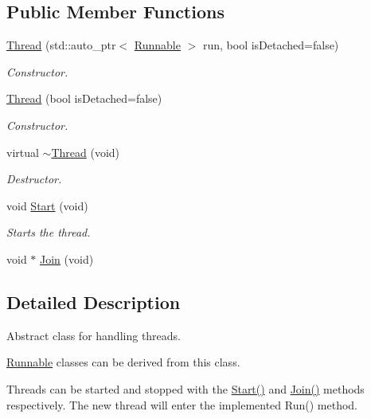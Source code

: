 \subsection*{Public Member Functions}
\begin{DoxyCompactItemize}
\item 
\hyperlink{class_thread_a027b9eb38e4d59c076501b305b42f575}{Thread} (std\-::auto\-\_\-ptr$<$ \hyperlink{class_runnable}{Runnable} $>$ run, bool is\-Detached=false)
\begin{DoxyCompactList}\small\item\em Constructor. \end{DoxyCompactList}\item 
\hyperlink{class_thread_a403714feecd93ac10c101a47b7649204}{Thread} (bool is\-Detached=false)
\begin{DoxyCompactList}\small\item\em Constructor. \end{DoxyCompactList}\item 
virtual \hyperlink{class_thread_af1e25588ebe47a2a6d79ef8c686a992b}{$\sim$\-Thread} (void)
\begin{DoxyCompactList}\small\item\em Destructor. \end{DoxyCompactList}\item 
void \hyperlink{class_thread_a2b42f82341afd2747ea093b6ac8b91cb}{Start} (void)
\begin{DoxyCompactList}\small\item\em Starts the thread. \end{DoxyCompactList}\item 
void $\ast$ \hyperlink{class_thread_a8f33f7750321d5df9188033e7e3e300d}{Join} (void)
\end{DoxyCompactItemize}


\subsection{Detailed Description}
Abstract class for handling threads. 

\hyperlink{class_runnable}{Runnable} classes can be derived from this class.

Threads can be started and stopped with the \hyperlink{class_thread_a2b42f82341afd2747ea093b6ac8b91cb}{Start()} and \hyperlink{class_thread_a8f33f7750321d5df9188033e7e3e300d}{Join()} methods respectively. The new thread will enter the implemented Run() method. 

